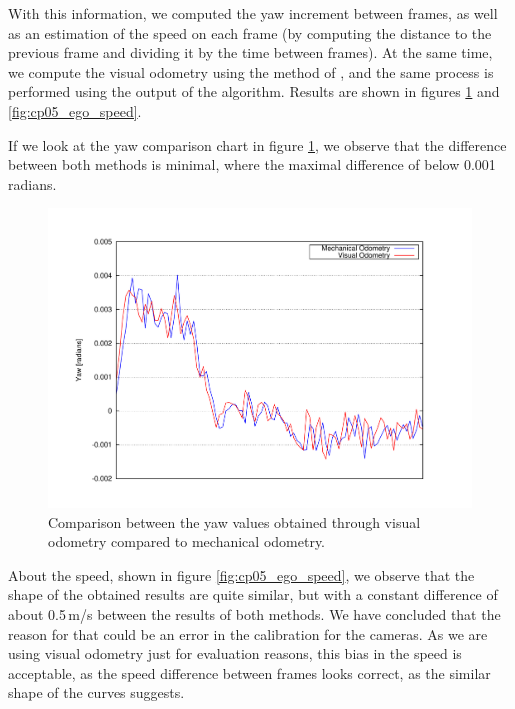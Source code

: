 With this information, we computed the yaw increment between frames, as well as an estimation of the speed on each frame (by computing the distance to the previous frame and dividing it by the time between frames). At the same time, we compute the visual odometry using the method of \cite{geiger2011stereoscan}, and the same process is performed using the output of the algorithm. Results are shown in figures \ref{fig:cp05_ego_yaw} and \ref{fig:cp05_ego_speed}.

If we look at the yaw comparison chart in figure \ref{fig:cp05_ego_yaw}, we observe that the difference between both methods is minimal, where the maximal difference of below 0.001 radians.

 \begin{figure}[th]
  \centering
  \includegraphics[trim=50 50 90 60, clip]{yaw}
  \caption{Comparison between the yaw values obtained through visual odometry compared to mechanical odometry.}\label{fig:cp05_ego_yaw}
\end{figure}

About the speed, shown in figure \ref{fig:cp05_ego_speed}, we observe that the shape of the obtained results are quite similar, but with a constant difference of about 0.5\,m/s between the results of both methods. We have concluded that the reason for that could be an error in the calibration for the cameras. As we are using visual odometry just for evaluation reasons, this bias in the speed is acceptable, as the speed difference between frames looks correct, as the similar shape of the curves suggests.


